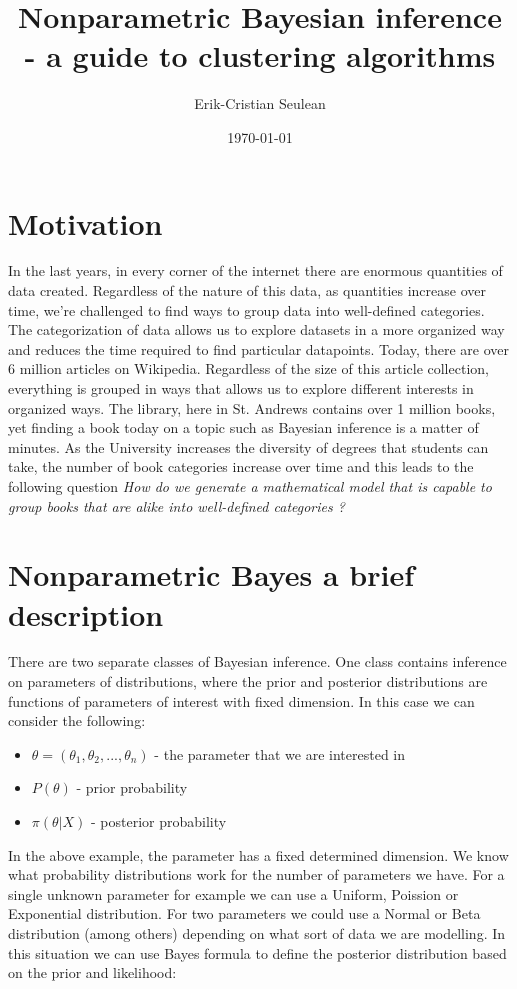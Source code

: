 \documentclass[12pt,a4paper]{article}
\author{Erik-Cristian Seulean}
\title{Nonparametric Bayesian inference - a guide to clustering algorithms}
\date{\today}
\begin{document}
\maketitle
\section{Motivation}

In the last years, in every corner of the internet there are enormous quantities of data created. 
Regardless of the nature of this data, as quantities increase over time, we're challenged to find
ways to group data into well-defined categories. The categorization of data allows us to explore 
datasets in a more organized way and reduces the time required to find particular datapoints. 
Today, there are over 6 million articles on Wikipedia. Regardless of the size of this article
collection, everything is grouped in ways that allows us to explore different interests in
organized ways. The library, here in St. Andrews contains over 1 million books, yet finding a book
today on a topic such as Bayesian inference is a matter of minutes. As the University increases the
diversity of degrees that students can take, the number of book categories increase over time and 
this leads to the following question \textit{How do we generate a mathematical model that is capable
to group books that are alike into well-defined categories ?}

\section{Nonparametric Bayes a brief description}
There are two separate classes of Bayesian inference. One class contains inference on
parameters of distributions, where the prior and posterior distributions are functions of parameters of
interest with fixed dimension. In this case we can consider the following: 

\begin{itemize}
    \item $\theta = (\theta_{1}, \theta_{2}, ..., \theta_{n})$ - the parameter that we are interested in 
    \item $P(\theta)$ - prior probability
    \item $\pi(\theta|X)$ - posterior probability
\end{itemize}

In the above example, the parameter has a fixed determined dimension. We know what probability distributions
work for the number of parameters we have. For a single unknown parameter for example we can use a Uniform, 
Poission or Exponential distribution. For two parameters we could use a Normal or Beta distribution (among others)
depending on what sort of data we are modelling. 
In this situation we can use Bayes formula to define the posterior distribution based on the prior and likelihood:
\end{document}
